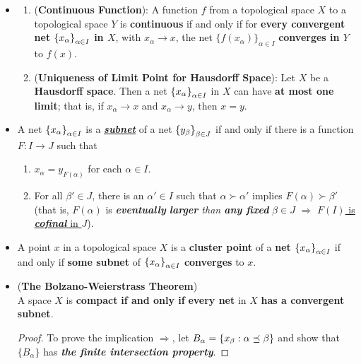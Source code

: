 \documentclass[11pt]{article}
\begin{document}
\begin{itemize}
\item \begin{proposition} \citep{munkres2000topology}
\begin{enumerate}
\item (\textbf{Continuous Function}): A function $f$ from a topological space $X$ to a topological space $Y$ is \textbf{continuous} if and only if for \textbf{every convergent net} $\left\{x_\alpha\right\}_{\alpha \in I}$ \textbf{in $X$}, with $x_{\alpha} \rightarrow x$, the net $\{f(x_{\alpha})\}_{\alpha \in I}$ \textbf{converges in $Y$} to $f(x)$.
\item (\textbf{Uniqueness of Limit Point for Hausdorff Space}): Let $X$ be a \textbf{Hausdorff space}. Then a net $\left\{x_\alpha\right\}_{\alpha \in I}$ in $X$ can have \textbf{at most one limit}; that is, if $x_{\alpha} \rightarrow x$ and $x_{\alpha} \rightarrow y$, then $x = y$.
\end{enumerate}
\end{proposition}

\item \begin{definition}
A net  $\left\{x_\alpha\right\}_{\alpha \in I}$ is a \underline{\emph{\textbf{subnet}}} of a net  $\left\{y_\beta\right\}_{\beta \in J}$ if and only if there is
a function $F: I \rightarrow J$ such that
\begin{enumerate}
\item $x_\alpha = y_{F(\alpha)}$ for each $\alpha \in I$.
\item For all $\beta' \in J$, there is an $\alpha' \in I$ such that $\alpha \succ \alpha'$ implies $F(\alpha) \succ \beta'$ (that is,
$F(\alpha)$ is \emph{\textbf{eventually} \textbf{larger} than \textbf{any fixed}} $\beta \in J$ $\Rightarrow$ \underline{$F(I)$ is \textbf{\emph{cofinal}} in $J$}).
\end{enumerate}
\end{definition}

\item \begin{proposition}
A point $x$ in a topological space $X$ is a \textbf{cluster point} of a \textbf{net} $\left\{x_\alpha\right\}_{\alpha \in I}$ if and only if \textbf{some subnet} of $\left\{x_\alpha\right\}_{\alpha \in I}$ \textbf{converges} to $x$.
\end{proposition}

\item \begin{theorem} (\textbf{The Bolzano-Weierstrass Theorem}) \citep{reed1980methods, munkres2000topology} \\
A space $X$ is \textbf{compact} \textbf{if and only if} \textbf{every net} in $X$ \textbf{has a convergent subnet}.
\end{theorem}
\begin{proof}To prove the implication $\Rightarrow$, let $B_{\alpha} = \left\{x_{\beta}: \alpha \preceq \beta\right\}$ and show that
$\{B_{\alpha}\}$ has \emph{\textbf{the finite intersection property}}. 


\end{proof}
\end{itemize}
\end{document}
